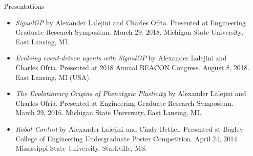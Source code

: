 \begin{rSection}{Presentations}
\begin{itemize}
\item \textit{SignalGP}
by Alexander Lalejini and Charles Ofria.
Presented at Engineering Graduate Research Symposium. March 29, 2018. Michigan State University, East Lansing, MI.

\item \textit{Evolving event-driven agents with SignalGP}
by Alexander Lalejini and Charles Ofria.
Presented at 2018 Annual BEACON Congress. August 8, 2018. East Lansing, MI (USA).

\item \textit{The Evolutionary Origins of Phenotypic Plasticity}
by Alexander Lalejini and Charles Ofria.
Presented at Engineering Graduate Research Symposium. March 29, 2016. Michigan State University, East Lansing, MI.

\item \textit{Robot Control}
by Alexander Lalejini and Cindy Bethel.
Presented at Bagley College of Engineering Undergraduate Poster Competition. April 24, 2014. Mississippi State University, Starkville, MS.

\end{itemize}

\end{rSection}